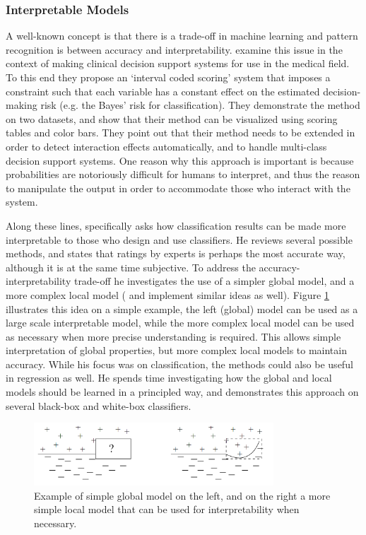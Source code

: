 \subsubsection{Interpretable Models} \label{sec:model_interp}
    A well-known concept is that there is a trade-off in machine learning and pattern recognition is between accuracy and interpretability. \citet{Van_Belle2012-dt} examine this issue in the context of making clinical decision support systems for use in the medical field. To this end they propose an `interval coded scoring' system that imposes a constraint such that each variable has a constant effect on the estimated decision-making risk (e.g. the Bayes' risk for classification).  They demonstrate the method on two datasets, and show that their method can be visualized using scoring tables and color bars. They point out that their method needs to be extended in order to detect interaction effects automatically, and to handle multi-class decision support systems. One reason why this approach is important is because probabilities are notoriously difficult for humans to interpret, and thus the reason to manipulate the output in order to accommodate those who interact with the system.

    Along these lines,  \citet{Ruping2006-xj} specifically asks how classification results can be made more interpretable to those who design and use classifiers. He reviews several possible methods, and states that ratings by experts is perhaps the most accurate way, although it is at the same time subjective. To address the accuracy-interpretability trade-off he investigates the use of a simpler global model, and a more complex local model (\citet{Otte2013-oo} and \citet{Ribeiro2016-uc} implement similar ideas as well). Figure \ref{fig:ruping} illustrates this idea on a simple example, the left (global) model can be used as a large scale interpretable model, while the more complex local model can be used as necessary when more precise understanding is required. This allows simple interpretation of global properties, but more complex local models to maintain accuracy. While his focus was on classification, the methods could also be useful in regression as well. He spends time investigating how the global and local models should be learned in a principled way, and demonstrates this approach on several black-box and white-box classifiers. 

    \begin{figure}[htbp]
    \centering
    \includegraphics[width=0.8\textwidth]{Figures/ruping_global_local.png}
    \caption{Example of simple global model on the left, and on the right a more simple local model that can be used for interpretability when necessary.}
    \label{fig:ruping}
    \end{figure}


